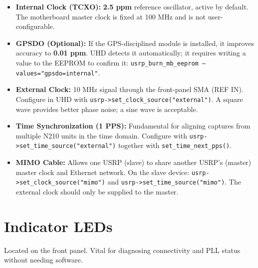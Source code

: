 \documentclass[11pt]{article}
\begin{document}
\begin{itemize}
    \item \textbf{Internal Clock (TCXO):} \textbf{2.5 ppm} reference oscillator, active by default. The motherboard master clock is fixed at 100 MHz and is not user-configurable.
    \item \textbf{GPSDO (Optional):} If the GPS-disciplined module is installed, it improves accuracy to \textbf{0.01 ppm}. UHD detects it automatically; it requires writing a value to the EEPROM to confirm it: \texttt{usrp\_burn\_mb\_eeprom --values="gpsdo=internal"}.
    \item \textbf{External Clock:} 10 MHz signal through the front-panel SMA (REF IN). Configure in UHD with \texttt{usrp->set\_clock\_source("external")}. A square wave provides better phase noise; a sine wave is acceptable.
    \item \textbf{Time Synchronization (1 PPS):} Fundamental for aligning captures from multiple N210 units in the time domain. Configure with \texttt{usrp->set\_time\_source("external")} together with \texttt{set\_time\_next\_pps()}.
    \item \textbf{MIMO Cable:} Allows one USRP (slave) to share another USRP's (master) master clock and Ethernet network. On the slave device: \texttt{usrp->set\_clock\_source("mimo")} and \texttt{usrp->set\_time\_source("mimo")}. The external clock should only be supplied to the master.
\end{itemize}

\section{Indicator LEDs}

Located on the front panel. Vital for diagnosing connectivity and PLL status without needing software.
\end{document}
